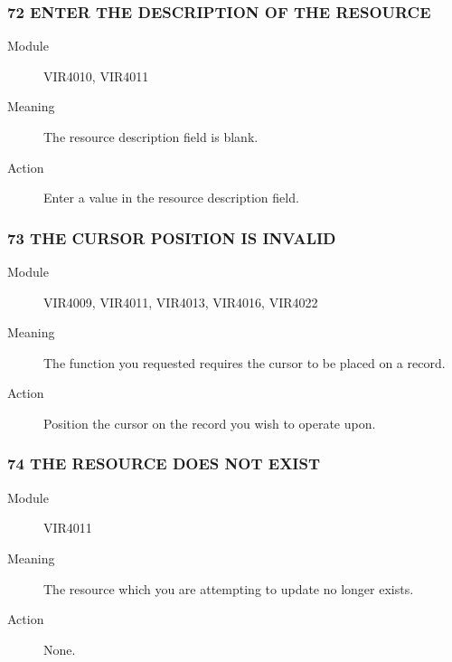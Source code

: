 \documentclass[letterpaper,10pt,english]{sphinxmanual}
\begin{document}
\subsubsection{72 ENTER THE DESCRIPTION OF THE RESOURCE}
\label{\detokenize{messages:enter-the-description-of-the-resource}}\begin{description}
\item[{Module}] \leavevmode
VIR4010, VIR4011

\item[{Meaning}] \leavevmode
The resource description field is blank.

\item[{Action}] \leavevmode
Enter a value in the resource description field.

\end{description}


\subsubsection{73 THE CURSOR POSITION IS INVALID}
\label{\detokenize{messages:the-cursor-position-is-invalid}}\begin{description}
\item[{Module}] \leavevmode
VIR4009, VIR4011, VIR4013, VIR4016, VIR4022

\item[{Meaning}] \leavevmode
The function you requested requires the cursor to be placed on a record.

\item[{Action}] \leavevmode
Position the cursor on the record you wish to operate upon.

\end{description}


\subsubsection{74 THE RESOURCE DOES NOT EXIST}
\label{\detokenize{messages:the-resource-does-not-exist}}\begin{description}
\item[{Module}] \leavevmode
VIR4011

\item[{Meaning}] \leavevmode
The resource which you are attempting to update no longer exists.

\item[{Action}] \leavevmode
None.

\end{description}
\end{document}
